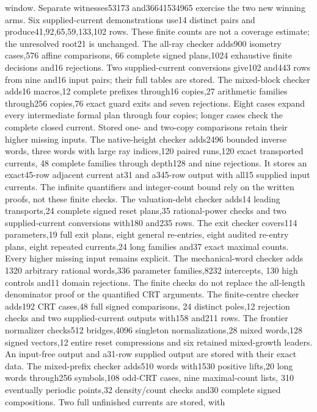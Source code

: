 \documentclass[11pt]{article}
\begin{document}
window. Separate witnesses53173 and36641534965 exercise the two new
winning arms. Six supplied-current demonstrations use14 distinct pairs
and produce41,92,65,59,133,102 rows. These finite counts are not a
coverage estimate; the unresolved root21 is unchanged.
The all-ray checker adds900 isometry cases,576 affine comparisons,
66 complete signed plans,1024 exhaustive finite decisions and16
rejections. Two supplied-current conversions give102 and443 rows from
nine and16 input pairs; their full tables are stored.
The mixed-block checker adds16 macros,12 complete prefixes through16
copies,27 arithmetic families through256 copies,76 exact guard exits
and seven rejections. Eight cases expand every intermediate formal plan
through four copies; longer cases check the complete closed current.
Stored one- and two-copy comparisons retain their higher missing inputs.
The native-height checker adds2496 bounded inverse words, three words
with large ray indices,120 paired runs,120 exact transported currents,
48 complete families through depth128 and nine rejections. It stores
an exact45-row adjacent current at31 and a345-row output with all15
supplied input currents. The infinite quantifiers and integer-count
bound rely on the written proofs, not these finite checks.
The valuation-debt checker adds14 leading transports,24 complete signed
reset plans,35 rational-power checks and two supplied-current conversions
with180 and235 rows. The exit checker covers114 parameters,19 full exit
plans, eight general re-entries, eight audited re-entry plans, eight
repeated currents,24 long families and37 exact maximal counts. Every
higher missing input remains explicit. The mechanical-word checker adds
1320 arbitrary rational words,336 parameter families,8232 intercepts,
130 high controls and11 domain rejections. The finite checks do not
replace the all-length denominator proof or the quantified CRT arguments.
The finite-centre checker adds192 CRT cases,48 full signed comparisons,
24 distinct poles,12 rejection checks and two supplied-current outputs
with158 and211 rows. The frontier normalizer checks512 bridges,4096
singleton normalizations,28 mixed words,128 signed vectors,12 entire reset
compressions and six retained mixed-growth leaders. An input-free output
and a31-row supplied output are stored with their exact data.
The mixed-prefix checker adds510 words with1530 positive lifts,20 long
words through256 symbols,108 odd-CRT cases, nine maximal-count lists,
310 eventually periodic points,32 density/count checks and30 complete
signed compositions. Two full unfinished currents are stored, with
\end{document}
